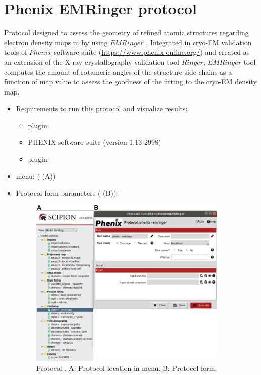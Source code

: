 \section{Phenix EMRinger protocol}
\label{app:emRingerProtocol}%
Protocol designed to assess the geometry of refined atomic structures regarding electron density maps in \scipion by using $EMRinger$ \citep{barad2015}. Integrated in cryo-EM validation tools of $Phenix$ software suite (\url{https://www.phenix-online.org/}) and created as an extension of the X-ray crystallography validation tool $Ringer$, $EMRinger$ tool computes the amount of rotameric angles of the structure side chains as a function of map value to assess the goodness of the fitting to the cryo-EM density map.

\begin{itemize}
 \item Requirements to run this protocol and visualize results:
    \begin{itemize}
        \item \scipion plugin: 
        \item PHENIX software suite (version 1.13-2998)
        \item \scipion plugin: 
    \end{itemize}
 \item \scipion menu:
   ( (A))
  
 \item Protocol form parameters ( (B)):
  
    \begin{figure}[H]
     \centering 
     \captionsetup{width=.7\linewidth} 
     \includegraphics[width=0.90\textwidth]{Images_appendix/Fig139.pdf}
     \caption{Protocol . A: Protocol location in \scipion menu. B: Protocol form.}
     \label{fig:app_protocol_emringer_1}
    \end{figure}


\end{itemize}
